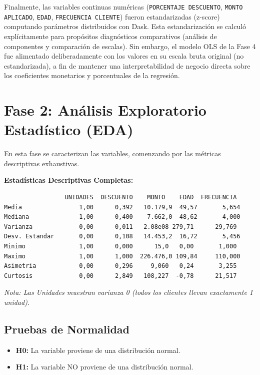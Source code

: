 \documentclass[12pt,letterpaper]{article}
\begin{document}
Finalmente, las variables continuas numéricas (\texttt{PORCENTAJE DESCUENTO}, \texttt{MONTO APLICADO}, \texttt{EDAD}, \texttt{FRECUENCIA CLIENTE}) fueron estandarizadas (z-score) computando parámetros distribuidos con Dask. Esta estandarización se calculó explícitamente para propósitos diagnósticos comparativos (análisis de componentes y comparación de escalas). Sin embargo, el modelo OLS de la Fase 4 fue alimentado deliberadamente con los valores en su escala bruta original (no estandarizada), a fin de mantener una interpretabilidad de negocio directa sobre los coeficientes monetarios y porcentuales de la regresión.

\section{Fase 2: Análisis Exploratorio Estadístico (EDA)}
En esta fase se caracterizan las variables, comenzando por las métricas descriptivas exhaustivas.

\vspace{0.4cm}
\noindent\textbf{Estadísticas Descriptivas Completas:}
\begin{verbatim}
                 UNIDADES  DESCUENTO    MONTO    EDAD  FRECUENCIA
Media                1,00      0,392   10.179,9  49,57       5,654
Mediana              1,00      0,400    7.662,0  48,62       4,000
Varianza             0,00      0,011   2.08e08 279,71      29,769
Desv. Estandar       0,00      0,108   14.453,2  16,72       5,456
Minimo               1,00      0,000      15,0   0,00       1,000
Maximo               1,00      1,000  226.476,0 109,84     110,000
Asimetria            0,00      0,296     9,060   0,24       3,255
Curtosis             0,00      2,849   108,227  -0,78      21,517
\end{verbatim}
\vspace{0.4cm}
\textit{Nota: Las Unidades muestran varianza 0 (todos los clientes llevan exactamente 1 unidad).}

\subsection{Pruebas de Normalidad}
\begin{itemize}
    \item \textbf{H0:} La variable proviene de una distribución normal.
    \item \textbf{H1:} La variable NO proviene de una distribución normal.
\end{itemize}
\end{document}
